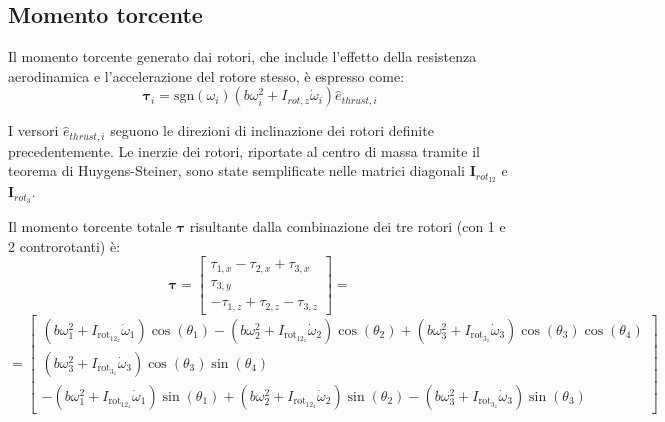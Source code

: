 \subsection{Momento torcente}
Il momento torcente generato dai rotori, che include l'effetto della resistenza aerodinamica e l'accelerazione del rotore stesso, è espresso come:
\begin{equation}
    \bm{\tau}_i = \text{sgn}(\omega_i) \left( b\omega_i^2 + I_{rot,z}\dot{\omega}_i \right) \hat{e}_{thrust,i} \label{eq:torcente_base}
\end{equation}

I versori $\hat{e}_{thrust,i}$ seguono le direzioni di inclinazione dei rotori definite precedentemente. Le inerzie dei rotori, riportate al centro di massa tramite il teorema di Huygens-Steiner, sono state semplificate nelle matrici diagonali $\bm{I}_{rot_{12}}$ e $\bm{I}_{rot_{3}}$.

Il momento torcente totale $\bm{\tau}$ risultante dalla combinazione dei tre rotori (con 1 e 2 controrotanti) è:
\begin{equation*}
    \bm{\tau} = \begin{bmatrix}
        \tau_{1,x} - \tau_{2,x} + \tau_{3,x} \\
        \tau_{3,y} \\
        -\tau_{1,z} + \tau_{2,z} - \tau_{3,z}
    \end{bmatrix} = 
\end{equation*}
\begin{equation}
    =	\begin{bmatrix}
	 		(b\omega_{1}^2+I_{\text{rot}_{12_{z}}}\dot\omega_{1}) \cos(\theta_1) -	(b\omega_{2}^2+I_{\text{rot}_{12_{z}}}\dot\omega_{2}) \cos(\theta_2) + (b\omega_{3}^2+I_{\text{rot}_{3_{z}}}\dot\omega_{3})\cos(\theta_3)\cos(\theta_4) \\
	 		(b\omega_{3}^2+I_{\text{rot}_{3_{z}}}\dot\omega_{3})\cos(\theta_3)\sin(\theta_4) \\
	 	-	(b\omega_{1}^2+I_{\text{rot}_{12_{z}}}\dot\omega_{1})\sin(\theta_1)+ 	(b\omega_{2}^2+I_{\text{rot}_{12_{z}}}\dot\omega_{2})  \sin(\theta_2)	-	(b\omega_{3}^2+I_{\text{rot}_{3_{z}}}\dot\omega_{3})\sin(\theta_3)
	 	\end{bmatrix}
        \label{eq:tau_totale}
\end{equation}


